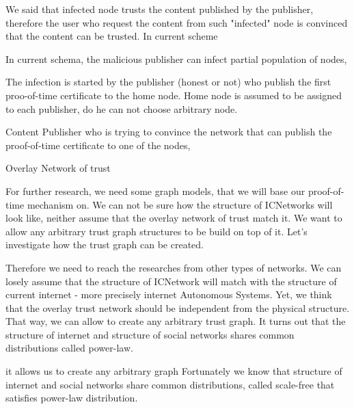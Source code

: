\documentclass[nostrict]{szablonPG}
\begin{document}
We said that infected node trusts the content published by the publisher, therefore the user who request the content from such "infected" node is convinced that the content can be trusted. In current scheme 

In current schema, the malicious publisher can infect partial population of nodes, 



 The infection is started by the publisher (honest or not) who publish the first proo-of-time certificate to the home node. Home node is assumed to be assigned to each publisher, do he can not choose arbitrary node. 


Content Publisher who is trying to convince the network that can publish the proof-of-time certificate to one of the nodes, 

Overlay Network of trust

For further research, we need some graph models, that we will base our proof-of-time mechanism on. We can not be sure how the structure of ICNetworks will look like, neither assume that the overlay network of trust match it. We want to allow any arbitrary trust graph structures to be build on top of it. Let's investigate how the trust graph can be created. 

Therefore we need to reach the researches from other types of networks. We can losely assume that the structure of ICNetwork will match with the structure of current internet - more precisely internet Autonomous Systems. Yet, we think that the overlay trust network should be independent from the physical structure.  That way, we can allow to create any arbitrary trust graph. It turns out that the structure of internet and structure of social networks shares common distributions called power-law. 

it allows us to create any arbitrary graph  Fortunately we know that structure of internet and social networks share common distributions, called scale-free that satisfies power-law distribution. 




\end{document}
